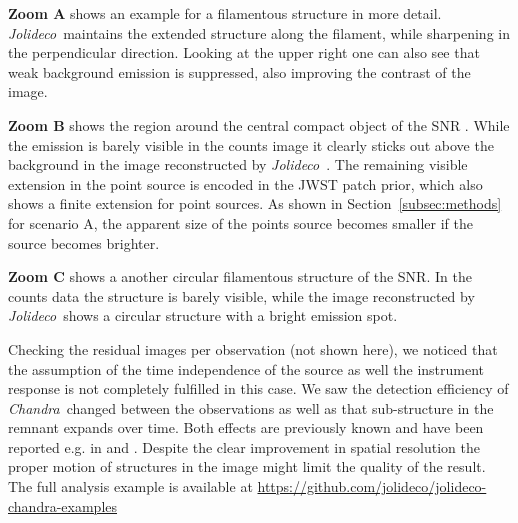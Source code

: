 \documentclass[twocolumn]{aastex631}
\newcommand{\chandra}{\textit{Chandra}~}
\newcommand{\xmm}{\textit{XMM}~}
\newcommand{\jolideco}{\textit{Jolideco}~}
\begin{document}
    \textbf{Zoom A} shows an example for a filamentous structure in more detail. \jolideco maintains the extended structure along the filament, while sharpening in the perpendicular direction. Looking at the upper right one can also see that weak background emission is suppressed, also improving the contrast of the image.
    
    \textbf{Zoom B} shows the region around the central compact object of the SNR \cite{Vogt2018}. While the emission is barely visible in the counts image it clearly sticks out above the background in the image reconstructed by \jolideco. The remaining visible extension in the point source is encoded in the JWST patch prior, which also shows a finite extension for point sources. As shown in Section~\ref{subsec:methods} for scenario A, the apparent size of the points source becomes smaller if the source becomes brighter.
    
    \textbf{Zoom C} shows a another circular filamentous structure of the SNR. In the counts data the structure is barely visible, while the image reconstructed by \jolideco shows a circular structure with a bright emission spot. 

    Checking the residual images per observation (not shown here), we noticed that the assumption of the time independence of the source as well the instrument response is not completely fulfilled in this case. We saw the detection efficiency of \chandra changed between the observations as well as that sub-structure in the remnant expands over time. Both effects are previously known and have been reported e.g. in \cite{Xi2019} and \cite{}. Despite the clear improvement in spatial resolution the proper motion of structures in the image might limit the quality of the result. The full analysis example is available at \url{https://github.com/jolideco/jolideco-chandra-examples}

        
\end{document}
